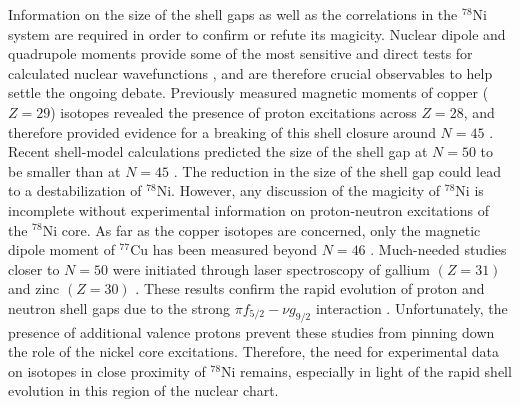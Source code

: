 \documentclass[reprint,superscriptaddress,amsmath,amssymb,aps,prl]{revtex4-1}
\begin{document}
Information on the size of the shell gaps as well as the correlations in the $^{78}$Ni system are required in order to confirm or refute its magicity. Nuclear dipole and quadrupole moments provide some of the most sensitive and direct tests for calculated nuclear wavefunctions \cite{Neyens2003}, and are therefore crucial observables to help settle the ongoing debate. Previously measured magnetic moments of copper ($Z=29$)  isotopes \cite{Cocolios2009,Cocolios2010,Flanagan2009,Vingerhoets2010,Vingerhoets2011} revealed the presence of proton excitations across $Z=28$, and therefore provided evidence for a breaking of this shell closure around $N=45$ \cite{Sieja2010}. Recent shell-model calculations predicted the size of the shell gap at $N=50$ to be smaller than at $N=45$ \cite{Sahin2017,Welker2017}. The reduction in the size of the shell gap could lead to a destabilization of $^{78}$Ni. However, any discussion of the magicity of $^{78}$Ni is incomplete without experimental information on proton-neutron excitations of the $^{78}$Ni core. As far as the copper isotopes are concerned, only the magnetic dipole moment of $^{77}$Cu has been measured beyond $N=46$ \cite{Koster2011}. Much-needed studies closer to $N=50$ were initiated through laser spectroscopy of gallium $(Z=31)$ \cite{Cheal2012,Procter2012b} and zinc $(Z=30)$ \cite{Yang2016,Wraith2017}. These results confirm the rapid evolution of proton and neutron shell gaps due to the strong $\pi f_{5/2}-\nu g_{9/2}$ interaction \cite{Otsuka2010}. Unfortunately, the presence of additional valence protons prevent these studies from pinning down the role of the nickel core excitations. Therefore, the need for experimental data on isotopes in close proximity of $^{78}$Ni remains, especially in light of the rapid shell evolution in this region of the nuclear chart.
\end{document}
